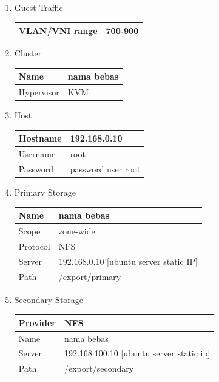 \begin{enumerate}
    \item Guest Traffic

          \begin{tabular}{|l|l|}
              \hline
              VLAN/VNI range & 700-900 \\ \hline
          \end{tabular}
          \label{tab:config-guest-traffic-table}

    \item Cluster

          \begin{tabular}{|l|l|}
              \hline
              Name       & nama bebas \\ \hline
              Hypervisor & KVM        \\ \hline
          \end{tabular}


    \item Host

          \begin{tabular}{|l|l|}
              \hline
              Hostname & 192.168.0.10       \\ \hline
              Username & root               \\ \hline
              Password & password user root \\ \hline
          \end{tabular}

    \item Primary Storage

          \begin{tabular}{|l|l|}
              \hline
              Name     & nama bebas                             \\ \hline
              Scope    & zone-wide                              \\ \hline
              Protocol & NFS                                    \\ \hline
              Server   & 192.168.0.10 [ubuntu server static IP] \\ \hline
              Path     & /export/primary                        \\ \hline
          \end{tabular}

    \item Secondary Storage

          \begin{tabular}{|l|l|}
              \hline
              Provider & NFS                                      \\ \hline
              Name     & nama bebas                               \\ \hline
              Server   & 192.168.100.10 [ubuntu server static ip] \\ \hline
              Path     & /export/secondary                        \\ \hline
          \end{tabular}
\end{enumerate}

